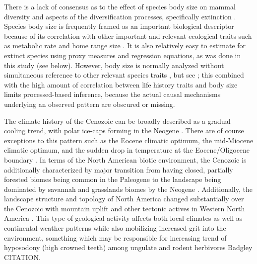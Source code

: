 \documentclass[12pt,letterpaper]{article}
\begin{document}
There is a lack of consensus as to the effect of species body size on mammal diversity and aspects of the diversification processes, specifically extinction \citep{Liow2008,Liow2009,Tomiya2013,Smits2015b}. Species body size is frequently framed as an important biological descriptor because of its correlation with other important and relevant ecological traits such as metabolic rate and home range size \citep{Brown1995}. It is also relatively easy to estimate for extinct species using proxy measures and regression equations, as was done in this study (see below). However, body size is normally analyzed without simultaneous reference to other relevant species traits \citep{Liow2008,Huang2017,Raia2012f,Smith2004}, but see \citep{Smits2015b}; this combined with the high amount of correlation between life history traits and body size limits processed-based inference, because the actual causal mechanisms underlying an observed pattern are obscured or missing.

The climate history of the Cenozoic can be broadly described as a gradual cooling trend, with polar ice-caps forming in the Neogene \citep{Zachos2001,Zachos2008,Cramer2011}. There are of course exceptions to this pattern such as the Eocene climatic optimum, the mid-Miocene climatic optimum, and the sudden drop in temperature at the Eocene/Oligocene boundary \citep{Zachos2001,Zachos2008}. In terms of the North American biotic environment, the Cenozoic is additionally characterized by major transition from having closed, partially forested biomes being common in the Paleogene to the landscape being dominated by savannah and grasslands biomes by the Neogene \citep{Blois2009,Janis1993b,Janis2000,Stromberg2005}. Additionally, the landscape structure and topology of North America changed substantially over the Cenozoic with mountain uplift and other tectonic actives in Western North America \citep{Blois2009,Eronen2015,Janis2008a,Badgley2013}. This type of geological activity affects both local climates as well as continental weather patterns while also mobilizing increased grit into the environment, something which may be responsible for increasing trend of hyposodony (high crowned teeth) among ungulate and rodent herbivores \citep{Janis1993b,Jardine2012,Jernvall2002,Damuth2011} Badgley CITATION.
\end{document}
